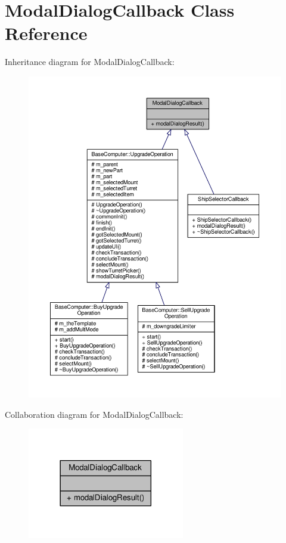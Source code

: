 \hypertarget{classModalDialogCallback}{}\section{Modal\+Dialog\+Callback Class Reference}
\label{classModalDialogCallback}


Inheritance diagram for Modal\+Dialog\+Callback\+:
\nopagebreak
\begin{figure}[H]
\begin{center}
\leavevmode
\includegraphics[width=350pt]{dd/dc0/classModalDialogCallback__inherit__graph}
\end{center}
\end{figure}


Collaboration diagram for Modal\+Dialog\+Callback\+:
\nopagebreak
\begin{figure}[H]
\begin{center}
\leavevmode
\includegraphics[width=194pt]{d2/d4c/classModalDialogCallback__coll__graph}
\end{center}
\end{figure}
